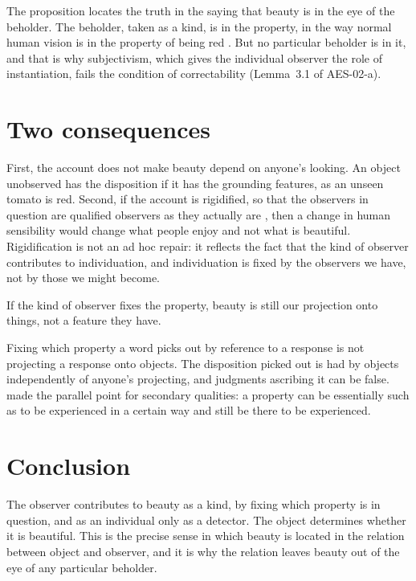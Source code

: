 \documentclass{situationist-preprint}
\begin{document}
The proposition locates the truth in the saying that beauty is in the eye of the beholder. The beholder, taken as a kind, is in the property, in the way normal human vision is in the property of being red \citep[II.viii]{Locke1690}. But no particular beholder is in it, and that is why subjectivism, which gives the individual observer the role of instantiation, fails the condition of correctability (Lemma~3.1 of AES-02-a).

\section{Two consequences}

First, the account does not make beauty depend on anyone's looking. An object unobserved has the disposition if it has the grounding features, as an unseen tomato is red. Second, if the account is rigidified, so that the observers in question are qualified observers as they actually are \citep{Johnston1989}, then a change in human sensibility would change what people enjoy and not what is beautiful. Rigidification is not an ad hoc repair: it reflects the fact that the kind of observer contributes to individuation, and individuation is fixed by the observers we have, not by those we might become.

\begin{objection}[Projection]
If the kind of observer fixes the property, beauty is still our projection onto things, not a feature they have.
\end{objection}

\begin{reply}
Fixing which property a word picks out by reference to a response is not projecting a response onto objects. The disposition picked out is had by objects independently of anyone's projecting, and judgments ascribing it can be false. \citet{McDowell1985} made the parallel point for secondary qualities: a property can be essentially such as to be experienced in a certain way and still be there to be experienced.
\end{reply}

\section{Conclusion}

The observer contributes to beauty as a kind, by fixing which property is in question, and as an individual only as a detector. The object determines whether it is beautiful. This is the precise sense in which beauty is located in the relation between object and observer, and it is why the relation leaves beauty out of the eye of any particular beholder.
\end{document}
